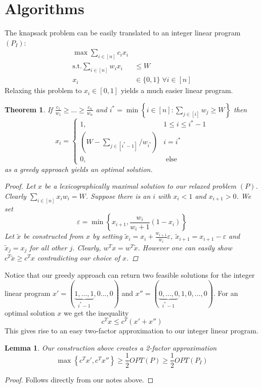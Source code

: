 \documentclass[a4paper, 12pt]{article}
\newtheorem{theorem}{Theorem}[section]
\newtheorem{lemma}{Lemma}[section]
\begin{document}
	\section{Algorithms}
	The knapsack problem can be easily translated to an integer linear program $(P_I)$: \begin{align*}
		\max \sum_{i \in [n]} c_i x_i &\\
		\text{s.t.}  \sum_{i \in [n]} w_i x_i &\leq W\\
		 x_i &\in \{0,1\} \; \forall i \in [n]
	\end{align*}
	Relaxing this problem to $x_i \in [0,1]$ yields a much easier linear program.
	\begin{theorem}
		If $\frac{c_1}{w_1} \geq ... \geq \frac{c_n}{w_n}$ and $i^* = \min \left\{i \in [n]: \sum_{j \in [i]} w_j \geq W\right\}$ then \[x_i = \begin{cases}
			1, & 1 \leq i \leq i^*-1\\
			\left(W- \sum_{j \in [i^*-1]}/w_{i^*}\right) & i = i^*\\
			0,& \text{ else}
		\end{cases}\]
	as a greedy approach yields an optimal solution.
	\begin{proof}
		Let $x$ be a lexicographically maximal solution to our relaxed problem $(P)$. Clearly $\sum_{i \in [n]} x_i w_i = W$. Suppose there is an $i$ with $x_i < 1$ and $x_{i+1} > 0$. We set \[\varepsilon = \min \left\{x_{i+1}, \frac{w_i}{w_i+1}(1-x_i)\right\}\]
		Let $\tilde{x}$ be constructed from $x$ by setting $\tilde{x}_i = x_i + \frac{w_{i+1}}{w_i}\varepsilon$, $\tilde{x}_{i+1} = x_{i+1} - \varepsilon$ and $\tilde{x}_j = x_j$ for all other $j$. Clearly, $w^Tx = w^T\tilde{x}$. However one can easily show $c^T\tilde{x} \geq c^Tx$ contradicting our choice of $x$.
	\end{proof}
	\end{theorem}
	Notice that our greedy approach can return two feasible solutions for the integer linear program $x' = (\underbrace{1,...,1}_{i^*-1},0...,0)$ and $x'' = (\underbrace{0,...,0}_{i^*-1},1,0,...,0)$. For an optimal solution $x$ we get the inequality \[c^Tx \leq c^T(x'+x'')\]
	This gives rise to an easy two-factor approximation to our integer linear program.
	\begin{lemma}
		Our construction above creates a 2-factor approximation \[\max\left\{c^Tx', c^Tx''\right\} \geq \frac{1}{2} OPT(P) \geq \frac{1}{2} OPT(P_I)\]
	\end{lemma}
	\begin{proof}
		Follows directly from our notes above.
	\end{proof}
\end{document}
